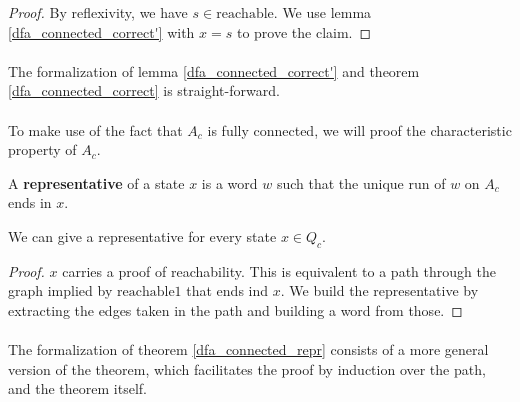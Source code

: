     \begin{proof}
        By reflexivity, we have $s \in \mathrm{reachable}$. 
        We use lemma \ref{dfa_connected_correct'} with $x = s$ to prove the claim.
    \end{proof}

    \paragraph{}
    The formalization of lemma \ref{dfa_connected_correct'} and theorem \ref{dfa_connected_correct} is straight-forward.
    

    \paragraph{}
    To make use of the fact that $A_c$ is fully connected, we will proof the characteristic property of $A_c$.

    \begin{definition}
        A \textbf{representative} of a state $x$ is a word $w$ such that the unique run of $w$ on $A_c$ ends in $x$.
    \end{definition}

    \begin{lemma}
        \label{dfa_connected_repr}
        We can give a representative for every state $x \in Q_c$.
    \end{lemma}

    \begin{proof}
        $x$ carries a proof of reachability.
        This is equivalent to a path through the graph implied by $\mathrm{reachable1}$ that ends ind $x$.
        We build the representative by extracting the edges taken in the path and building a word from those.
    \end{proof}

    \paragraph{}
    The formalization of theorem \ref{dfa_connected_repr} consists of a more general version of the theorem, 
    which facilitates the proof by induction over the path, and the theorem itself.

